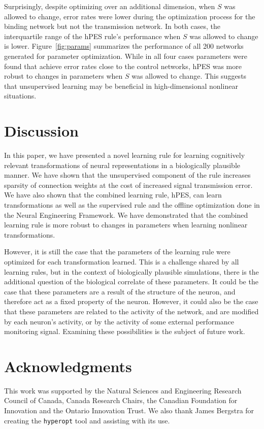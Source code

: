 \documentclass[10pt,letterpaper]{article}
\begin{document}
Surprisingly, despite optimizing over an additional dimension,
when $S$ was allowed to change, error rates were
lower during the optimization process
for the binding network but not the transmission network.
In both cases, the interquartile range of the hPES rule's
performance when $S$ was allowed to change is lower.
Figure~\ref{fig:params} summarizes the performance of
all 200 networks generated for parameter optimization.
While in all four cases parameters were found that achieve
error rates close to the control networks,
hPES was more robust to changes
in parameters when $S$ was allowed to change.
This suggests that unsupervised learning
may be beneficial in high-dimensional nonlinear situations.

\section{Discussion}

In this paper, we have presented a novel learning rule
for learning cognitively relevant transformations
of neural representations
in a biologically plausible manner.
We have shown that the unsupervised component of the rule
increases sparsity of connection weights
at the cost of increased signal transmission error.
We have also shown that the combined learning rule, hPES,
can learn transformations as well as the supervised rule
and the offline optimization done in the Neural Engineering Framework.
We have demonstrated that the combined learning rule
is more robust to changes in parameters
when learning nonlinear transformations.

However, it is still the case that
the parameters of the learning rule
were optimized for each transformation learned.
This is a challenge shared by all learning rules,
but in the context of biologically plausible simulations,
there is the additional question of
the biological correlate of these parameters.
It could be the case that these parameters
are a result of the structure of the neuron,
and therefore act as a fixed property of the neuron.
However, it could also be the case that
these parameters are related to the activity of the network,
and are modified by each neuron's activity,
or by the activity of some external
performance monitoring signal.
Examining these possibilities is the subject
of future work.

\section{Acknowledgments}

This work was supported by the Natural Sciences
and Engineering Research Council of Canada,
Canada Research Chairs,
the Canadian Foundation for Innovation
and the Ontario Innovation Trust.
We also thank James Bergstra for creating
the \texttt{hyperopt} tool and assisting
with its use.



\setlength{\bibleftmargin}{.125in}
\setlength{\bibindent}{-\bibleftmargin}


\end{document}
